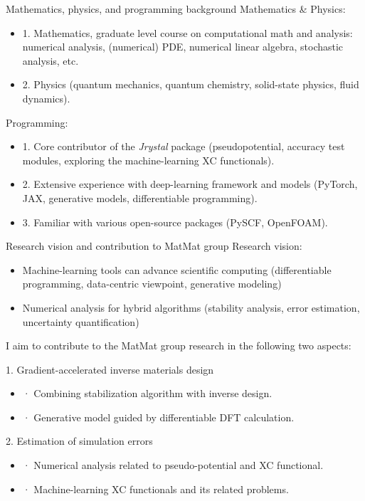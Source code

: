 \documentclass[paper slide]{beamer}
\begin{document}
 
\begin{frame}{Mathematics, physics, and programming background}
	\noindent
  Mathematics \& Physics:
	\begin{itemize}
    \item 1. Mathematics, graduate level course on computational math and analysis: 
		numerical analysis, (numerical) PDE, numerical linear algebra, stochastic analysis, etc.
		\item 2. Physics (quantum mechanics, quantum chemistry, solid-state physics, fluid dynamics).
  \end{itemize}
	\noindent
	Programming:
	\begin{itemize}
    \item 1. Core contributor of the \textit{Jrystal} package (pseudopotential,
		accuracy test modules, exploring the machine-learning XC functionals).
    \item 2. Extensive experience with deep-learning framework and models (PyTorch, JAX, generative models,
		differentiable programming).
    \item 3. Familiar with various open-source packages (PySCF, OpenFOAM).
  \end{itemize}
\end{frame}

 
\begin{frame}{Research vision and contribution to MatMat group}
	\noindent
	Research vision:
	\begin{itemize}
		\item Machine-learning tools can advance scientific computing (differentiable programming,
		data-centric viewpoint, generative modeling)
		\item Numerical analysis for hybrid algorithms (stability analysis, error estimation, 
		uncertainty quantification)
	\end{itemize}
	I aim to contribute to the MatMat group research in the following two aspects:
	
	1. Gradient-accelerated inverse materials design 
		\begin{itemize}
			\item · Combining stabilization algorithm with inverse design.
			\item · Generative model guided by differentiable DFT calculation.
		\end{itemize}
	
	2. Estimation of simulation errors
		\begin{itemize}
			\item · Numerical analysis related to pseudo-potential and XC functional.
			\item · Machine-learning XC functionals and its related problems.
		\end{itemize}
\end{frame}
\end{document}
